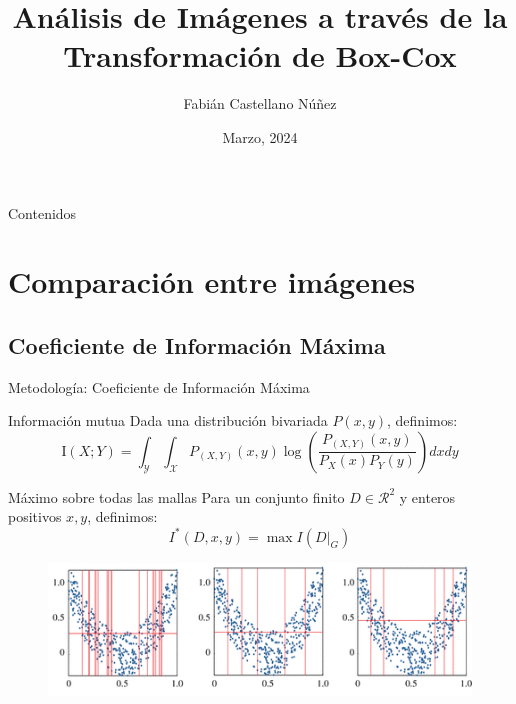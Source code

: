 \documentclass{beamer}
\title[Defensa de Memoria]{\bf An\'alisis de Im\'agenes a trav\'es de la Transformaci\'on de Box-Cox}
\author{Fabián Castellano Núñez}
\institute[Universidad Técnica Federico Santa María]
  {
  Profesor Guia: Ronny Vallejos A.
  }
\date{Marzo,  2024}
\begin{document}
\begin{frame}
  \titlepage
\end{frame}

\begin{frame}{Contenidos}
  \tableofcontents
\end{frame}





\section{Comparación entre imágenes}
\subsection{Coeficiente de Información Máxima}

\begin{frame}{Metodología: Coeficiente de Información Máxima}
     
    
    \begin{block}{Información mutua}
    Dada una distribución bivariada $P(x,y)$, definimos:
        \begin{equation}
            \mathrm{I}(X ; Y)=\int_{\mathcal{Y}} \int_{\mathcal{X}} P_{(X, Y)}(x, y) \log \left(\frac{P_{(X, Y)}(x, y)}{P_{X}(x) P_{Y}(y)}\right)dxdy
        \end{equation}
    \end{block}
     


    \begin{block}{Máximo sobre todas las mallas}
        Para un conjunto finito $D\in\mathcal{R}  ^2$ y enteros positivos $x,y$, definimos:
		$$
		I^*(D,x,y)=\max I(D|_G)
		$$
    \end{block}
    \begin{figure}
        \centering
        \includegraphics[scale=0.6] {rsos201424f03.png}
    \end{figure}
\end{frame}
\end{document}
